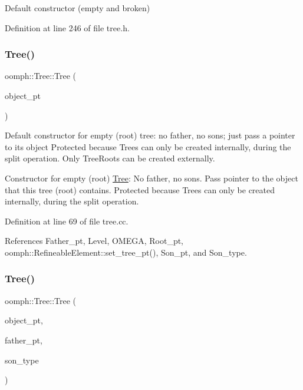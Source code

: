Default constructor (empty and broken) 



Definition at line 246 of file tree.\+h.

\mbox{\label{classoomph_1_1Tree_a6e78c3a130add917de182ab5f1674531}} 
\subsubsection{\texorpdfstring{Tree()}{Tree()}\hspace{0.1cm}{\footnotesize\ttfamily [3/4]}}
{\footnotesize\ttfamily oomph\+::\+Tree\+::\+Tree (\begin{DoxyParamCaption}\item[{\hyperlink{classoomph_1_1RefineableElement}{Refineable\+Element} $\ast$const \&}]{object\+\_\+pt }\end{DoxyParamCaption})\hspace{0.3cm}{\ttfamily [protected]}}



Default constructor for empty (root) tree\+: no father, no sons; just pass a pointer to its object Protected because Trees can only be created internally, during the split operation. Only Tree\+Roots can be created externally. 

Constructor for empty (root) \hyperlink{classoomph_1_1Tree}{Tree}\+: No father, no sons. Pass pointer to the object that this tree (root) contains. Protected because Trees can only be created internally, during the split operation. 

Definition at line 69 of file tree.\+cc.



References Father\+\_\+pt, Level, O\+M\+E\+GA, Root\+\_\+pt, oomph\+::\+Refineable\+Element\+::set\+\_\+tree\+\_\+pt(), Son\+\_\+pt, and Son\+\_\+type.

\mbox{\label{classoomph_1_1Tree_a9d611dde1f429500330f28e56ee71883}} 
\subsubsection{\texorpdfstring{Tree()}{Tree()}\hspace{0.1cm}{\footnotesize\ttfamily [4/4]}}
{\footnotesize\ttfamily oomph\+::\+Tree\+::\+Tree (\begin{DoxyParamCaption}\item[{\hyperlink{classoomph_1_1RefineableElement}{Refineable\+Element} $\ast$const \&}]{object\+\_\+pt,  }\item[{\hyperlink{classoomph_1_1Tree}{Tree} $\ast$const \&}]{father\+\_\+pt,  }\item[{const int \&}]{son\+\_\+type }\end{DoxyParamCaption})\hspace{0.3cm}{\ttfamily [protected]}}




